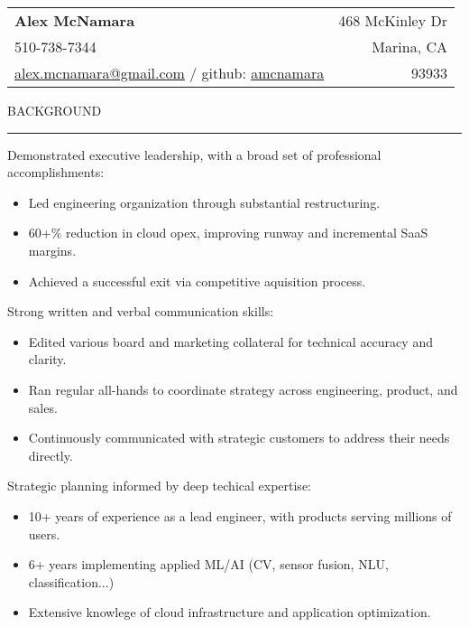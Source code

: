 \documentclass[12pt]{article}
\makeatletter
\newenvironment{justifycolumns}
{\begin{tabular*}{\textwidth}{@{\extracolsep{\fill}}lr@{}}}
{\end{tabular*}}
\newcommand{\row}[2]{#1 & #2 \\}
\newcommand{\blockseparation}{\vspace{0.13in}}
\newcommand{\heading}[1]{
	\vspace{0.05in}
	\uppercase{#1}
	\vspace{0.05in}
	\hrule
	\blockseparation
}
\newcommand{\bulletheading}[1]{
	\vspace{0.075in}
	\hspace{0.175in}
	{#1}
	\vspace{0.03in}
}
\newenvironment{tightbullets}
{\begin{itemize}}
{\end{itemize}}
\makeatother
\begin{document}
\begin{flushleft}

\begin{justifycolumns}
	\row{\Large\textbf{Alex McNamara}}{468 McKinley Dr}
	\row{510-738-7344}{Marina, CA}
	\row{
		\href{mailto:alex.mcnamara@gmail.com}{alex.mcnamara@gmail.com} / github: 
		\href{http://www.github.com/amcnamara}{amcnamara}
	}{93933}
\end{justifycolumns}
\vspace{0.175in}

\heading{Background}
\bulletheading{Demonstrated executive leadership, with a broad set of professional accomplishments:}
\begin{tightbullets}
	\item Led engineering organization through substantial restructuring.
	\item 60+\% reduction in cloud opex, improving runway and incremental SaaS margins.
	\item Achieved a successful exit via competitive aquisition process.
\end{tightbullets}

\bulletheading{Strong written and verbal communication skills:}
\begin{tightbullets}
	\item Edited various board and marketing collateral for technical accuracy and clarity.
	\item Ran regular all-hands to coordinate strategy across engineering, product, and sales.
	\item Continuously communicated with strategic customers to address their needs directly.
\end{tightbullets}

\bulletheading{Strategic planning informed by deep techical expertise:}
\begin{tightbullets}
	\item 10+ years of experience as a lead engineer, with products serving millions of users.
	\item 6+ years implementing applied ML/AI (CV, sensor fusion, NLU, classification...)
	\item Extensive knowlege of cloud infrastructure and application optimization.
\end{tightbullets}

\blockseparation


\end{flushleft}
\end{document}
